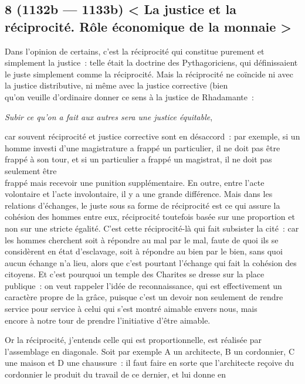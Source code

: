 \documentclass[french,twoside]{book} %
\begin{document}
\subsection[{8 (1132b — 1133b) < La justice et la réciprocité. Rôle économique de la monnaie >}]{8 (1132b — 1133b) < La justice et la réciprocité. Rôle économique de la monnaie >}
\noindent Dans l’opinion de certains, c’est la réciprocité qui constitue purement et simplement la justice : telle était la doctrine des Pythagoriciens, qui définissaient le juste simplement comme la réciprocité. Mais la réciprocité ne coïncide ni avec la justice distributive, ni même avec la justice corrective (bien \\
qu’on veuille d’ordinaire donner ce sens à la justice de Rhadamante :\par
{\itshape Subir ce qu’on a fait aux autres sera une justice équitable}, \par
car souvent réciprocité et justice corrective sont en désaccord : par exemple, si un homme investi d’une magistrature a frappé un particulier, il ne doit pas être frappé à son tour, et si un particulier a frappé un magistrat, il ne doit pas seulement être \\
frappé mais recevoir une punition supplémentaire. En outre, entre l’acte volontaire et l’acte involontaire, il y a une grande différence. Mais dans les relations d’échanges, le juste sous sa forme de réciprocité est ce qui assure la cohésion des hommes entre eux, réciprocité toutefois basée sur une proportion et non sur une stricte égalité. C’est cette réciprocité-là qui fait subsister la cité : car les hommes cherchent soit à répondre au mal  par le mal, faute de quoi ils se considèrent en état d’esclavage, soit à répondre au bien par le bien, sans quoi aucun échange n’a lieu, alors que c’est pourtant l’échange qui fait la cohésion des citoyens. Et c’est pourquoi un temple des Charites se dresse sur la place publique : on veut rappeler l’idée de reconnaissance, qui est effectivement un caractère propre de la grâce, puisque c’est un devoir non seulement de rendre service pour service à celui qui s’est montré aimable envers nous, mais \\
encore à notre tour de prendre l’initiative d’être aimable.\par
Or la réciprocité, j’entends celle qui est proportionnelle, est réalisée par l’assemblage en diagonale. Soit par exemple A un architecte, B un cordonnier, C une maison et D une chaussure : il faut faire en sorte que l’architecte reçoive du cordonnier le produit du travail de ce dernier, et lui donne en \\
\end{document}
